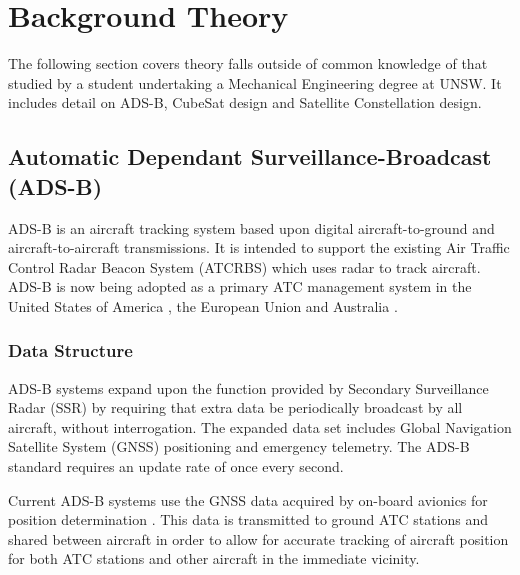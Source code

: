\section{Background Theory}
The following section covers theory falls outside of common knowledge of that studied by a student undertaking a Mechanical Engineering degree at UNSW. It includes detail on ADS-B, CubeSat design and Satellite Constellation design.
\subsection{Automatic Dependant Surveillance-Broadcast (ADS-B)}
ADS-B is an aircraft tracking system based upon digital aircraft-to-ground and aircraft-to-aircraft transmissions.  It is intended to support the existing Air Traffic Control Radar Beacon System (ATCRBS) which uses radar to track aircraft. ADS-B is now being adopted as a primary ATC management system in the United States of America \cite{ADSB_DOT}, the European Union and Australia \cite{ADSB_CASA_booklet}. 

\subsubsection{Data Structure}
ADS-B systems expand upon the function provided by Secondary Surveillance Radar (SSR) by requiring that extra data be periodically broadcast by all aircraft, without interrogation. The expanded data set includes Global Navigation Satellite System (GNSS) positioning and emergency telemetry. The ADS-B standard requires an update rate of once every second.

Current ADS-B systems use the GNSS data acquired by on-board avionics for position determination \cite{ADSB_ICAO_man}. This data is transmitted to ground ATC stations and shared between aircraft in order to allow for accurate tracking of aircraft position for both ATC stations and other aircraft in the immediate vicinity. 

